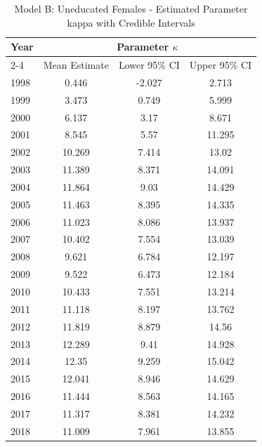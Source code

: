 \begin{landscape}
\begin{table}[htbp]
\centering
\caption{Model B: Uneducated Females - Estimated Parameter kappa  with Credible Intervals}
\label{tab:parameters_k9}
\begin{tabular}{@{}lccc@{}}
\toprule
Year & \multicolumn{3}{c}{Parameter \(\kappa\)} \\
\cmidrule(lr){2-4}
      & Mean Estimate & Lower 95\% CI & Upper 95\% CI \\
\midrule
1998 & 0.446 & -2.027 & 2.713 \\
1999 & 3.473 & 0.749 & 5.999 \\
2000 & 6.137 & 3.17 & 8.671 \\
2001 & 8.545 & 5.57 & 11.295 \\
2002 & 10.269 & 7.414 & 13.02 \\
2003 & 11.389 & 8.371 & 14.091 \\
2004 & 11.864 & 9.03 & 14.429 \\
2005 & 11.463 & 8.395 & 14.335 \\
2006 & 11.023 & 8.086 & 13.937 \\
2007 & 10.402 & 7.554 & 13.039 \\
2008 & 9.621 & 6.784 & 12.197 \\
2009 & 9.522 & 6.473 & 12.184 \\
2010 & 10.433 & 7.551 & 13.214 \\
2011 & 11.118 & 8.197 & 13.762 \\
2012 & 11.819 & 8.879 & 14.56 \\
2013 & 12.289 & 9.41 & 14.928 \\
2014 & 12.35 & 9.259 & 15.042 \\
2015 & 12.041 & 8.946 & 14.629 \\
2016 & 11.444 & 8.563 & 14.165 \\
2017 & 11.317 & 8.381 & 14.232 \\
2018 & 11.009 & 7.961 & 13.855 \\
\bottomrule
\end{tabular}
\end{table}
\end{landscape}